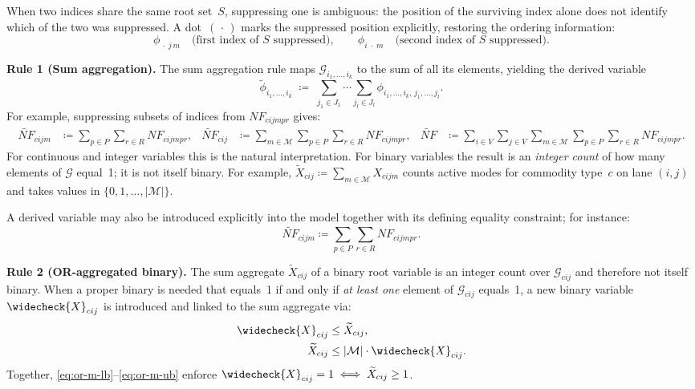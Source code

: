 \begin{convention}
{When two indices share the same root set~$S$, suppressing one is ambiguous:
the position of the surviving index alone does not identify which of the two
was suppressed. A dot~$(\,\cdot\,)$ marks the suppressed position explicitly,
restoring the ordering information:
\[
  \phi_{\,\cdot\; j\,m} \quad \text{(first index of $S$ suppressed)},
  \qquad
  \phi_{i\;\cdot\; m} \quad \text{(second index of $S$ suppressed)}.
\]

\medskip
\noindent\textbf{Rule 1 (Sum aggregation).}
The sum aggregation rule maps $\mathcal{G}_{i_1,\ldots,i_k}$ to the sum of
all its elements, yielding the derived variable
\[
  \widetilde{\phi}_{i_1,\ldots,i_k}
  \;\coloneqq\;
  \sum_{j_1 \in J_1}\cdots\sum_{j_l \in J_l}
  \phi_{i_1,\ldots,i_k,\,j_1,\ldots,j_l}.
\]
For example, suppressing subsets of indices from $NF_{cijmpr}$ gives:
\begin{align*}
  \widetilde{NF}_{cijm}
    &\coloneqq \sum_{p \in P}\sum_{r \in R} NF_{cijmpr}, &
  \widetilde{NF}_{cij}
    &\coloneqq \sum_{m \in \mathcal{M}}\sum_{p \in P}\sum_{r \in R} NF_{cijmpr}, &
  \widetilde{NF}
    &\coloneqq \sum_{i \in V}\sum_{j \in V}
               \sum_{m \in \mathcal{M}}\sum_{p \in P}\sum_{r \in R} NF_{cijmpr}.
\end{align*}
For continuous and integer variables this is the natural interpretation. For
binary variables the result is an \emph{integer count} of how many elements
of $\mathcal{G}$ equal~1; it is not itself binary. For example,
$\widetilde{X}_{cij} \coloneqq \sum_{m \in \mathcal{M}} X_{cijm}$ counts
active modes for commodity type~$c$ on lane $(i,j)$ and takes values in
$\{0,1,\dots,|\mathcal{M}|\}$.

A derived variable may also be introduced explicitly into the model together
with its defining equality constraint; for instance:
\begin{equation}
  \widetilde{NF}_{cijm}
    \coloneqq \sum_{p \in P}\sum_{r \in R} NF_{cijmpr}.
  \label{eq:aux-sum}
\end{equation}

\medskip
\noindent\textbf{Rule 2 (OR-aggregated binary).}
The sum aggregate $\widetilde{X}_{cij}$ of a binary root variable is an
integer count over $\mathcal{G}_{cij}$ and therefore not itself binary. When
a proper binary is needed that equals~1 if and only if \emph{at least one}
element of $\mathcal{G}_{cij}$ equals~1, a new binary variable
$\widecheck{X}_{cij}$ is introduced and linked to the sum aggregate via:
\begin{align}
  \widecheck{X}_{cij} &\leq \widetilde{X}_{cij},
    \label{eq:or-m-lb} \\
  \widetilde{X}_{cij} &\leq |\mathcal{M}|\cdot\widecheck{X}_{cij}.
    \label{eq:or-m-ub}
\end{align}
Together, \eqref{eq:or-m-lb}--\eqref{eq:or-m-ub} enforce
$\widecheck{X}_{cij} = 1 \iff \widetilde{X}_{cij} \geq 1$.

}
\end{convention}
